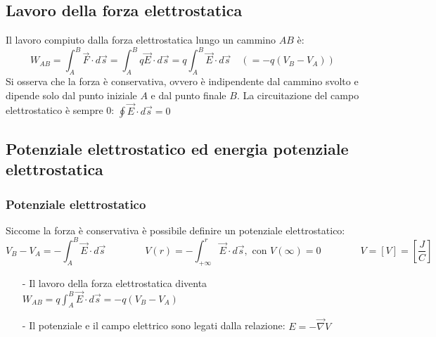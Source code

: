 \documentclass[a4paper]{article}
\newcommand\nab{\vec{\nabla}} %
\begin{document}
\newpage

\subsection{Lavoro della forza elettrostatica}
Il lavoro compiuto dalla forza elettrostatica lungo un cammino \(AB\) è:
\[W_{AB} = \int_A^B \vec{F} \cdot d\vec{s} = \int_A^B q \vec{E} \cdot d\vec{s} = q \int_A^B \vec{E} \cdot d\vec{s} \quad (= - q (V_B - V_A))\]
Si osserva che la forza è conservativa, ovvero è indipendente dal cammino svolto e dipende solo dal punto iniziale \(A\) e dal
punto finale \(B\). La circuitazione del campo elettrostatico è sempre 0: \(\displaystyle \oint \vec{E} \cdot d\vec{s} = 0\)

\subsection{Potenziale elettrostatico ed energia potenziale elettrostatica}
\subsubsection*{Potenziale elettrostatico}
Siccome la forza è conservativa è possibile definire un potenziale elettrostatico:
\[V_B - V_A = - \int_A^B \vec{E} \cdot d\vec{s} \qquad \qquad V(r) = -\int_{+\infty}^r \vec{E} \cdot d\vec{s}, \text{ con } V(\infty) = 0 \qquad \qquad V = \left[V\right] = \left[ \frac{J}{C} \right]\]

\begin{itemize}
	\item[-] Il lavoro della forza elettrostatica diventa \(\displaystyle W_{AB} = q \int_A^B \vec{E} \cdot d\vec{s} = - q (V_B - V_A)\)
	\item[-] Il potenziale e il campo elettrico sono legati dalla relazione: \(\displaystyle E = - \nab V\)
\end{itemize}
\end{document}
